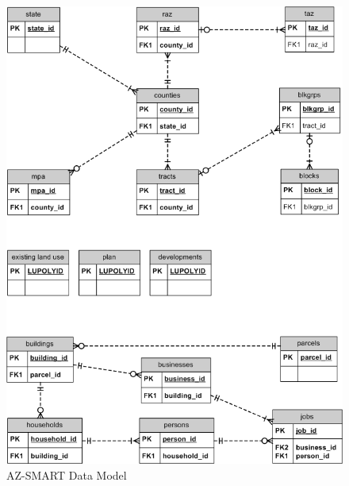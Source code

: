 \begin{figure}[h]
\begin{center}
\includegraphics[scale=0.5]{figures/AZ-SMART_data_model_diagram.png}
\caption{AZ-SMART Data Model}
\label{figDataModel}
\end{center}
\end{figure}
